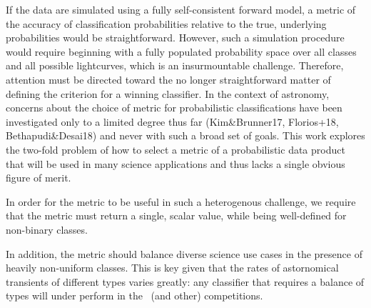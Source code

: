 If the data are simulated using a fully self-consistent forward model, a metric of the accuracy of classification probabilities relative to the true, underlying probabilities would be straightforward.
However, such a simulation procedure would require beginning with a fully populated probability space over all classes and all possible lightcurves, which is an insurmountable challenge.
Therefore, attention must be directed toward the no longer straightforward matter of defining the criterion for a winning classifier.
In the context of astronomy, concerns about the choice of metric for probabilistic classifications have been investigated only to a limited degree thus far (Kim\&Brunner17, Florios+18, Bethapudi\&Desai18) and never with such a broad set of goals.
This work explores the two-fold problem of how to select a metric of a probabilistic data product that will be used in many science applications and thus lacks a single obvious figure of merit.


In order for the metric to be useful in such a heterogenous challenge, we require that the metric must return a single, scalar value, while being well-defined for non-binary classes.

In addition, the metric should balance diverse science use cases in the presence of heavily non-uniform classes.
This is key given that the rates of astornomical transients of different types varies greatly: any classifier that requires a balance of types will under perform in the \plasticc\ (and other) competitions.

